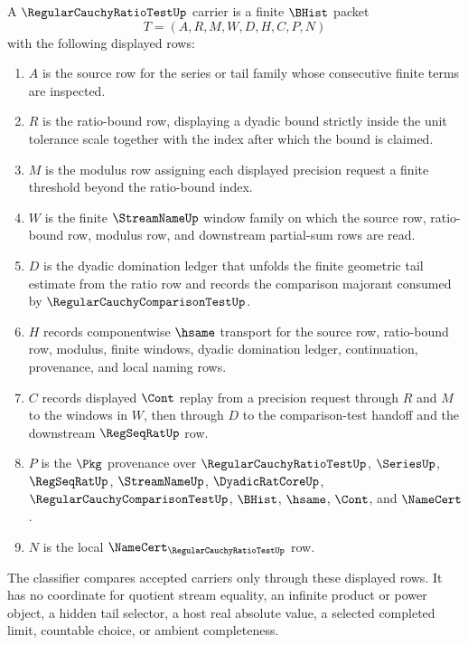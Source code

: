 \begin{definition}
\label{def:regular-cauchy-ratio-test-carrier}
A $\RegularCauchyRatioTestUp$ carrier is a finite $\BHist$ packet
$$
T=(A,R,M,W,D,H,C,P,N)
$$
with the following displayed rows:
\begin{enumerate}
\item $A$ is the source row for the series or tail family whose consecutive finite terms are inspected.
\item $R$ is the ratio-bound row, displaying a dyadic bound strictly inside the unit tolerance scale together with the index after which the bound is claimed.
\item $M$ is the modulus row assigning each displayed precision request a finite threshold beyond the ratio-bound index.
\item $W$ is the finite $\StreamNameUp$ window family on which the source row, ratio-bound row, modulus row, and downstream partial-sum rows are read.
\item $D$ is the dyadic domination ledger that unfolds the finite geometric tail estimate from the ratio row and records the comparison majorant consumed by $\RegularCauchyComparisonTestUp$.
\item $H$ records componentwise $\hsame$ transport for the source row, ratio-bound row, modulus, finite windows, dyadic domination ledger, continuation, provenance, and local naming rows.
\item $C$ records displayed $\Cont$ replay from a precision request through $R$ and $M$ to the windows in $W$, then through $D$ to the comparison-test handoff and the downstream $\RegSeqRatUp$ row.
\item $P$ is the $\Pkg$ provenance over $\RegularCauchyRatioTestUp$, $\SeriesUp$, $\RegSeqRatUp$, $\StreamNameUp$, $\DyadicRatCoreUp$, $\RegularCauchyComparisonTestUp$, $\BHist$, $\hsame$, $\Cont$, and $\NameCert$.
\item $N$ is the local $\NameCert_{\RegularCauchyRatioTestUp}$ row.
\end{enumerate}
The classifier compares accepted carriers only through these displayed rows. It has no coordinate for quotient stream equality, an infinite product or power object, a hidden tail selector, a host real absolute value, a selected completed limit, countable choice, or ambient completeness.
\end{definition}

